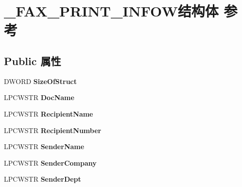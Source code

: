 \hypertarget{struct___f_a_x___p_r_i_n_t___i_n_f_o_w}{}\section{\+\_\+\+F\+A\+X\+\_\+\+P\+R\+I\+N\+T\+\_\+\+I\+N\+F\+O\+W结构体 参考}
\label{struct___f_a_x___p_r_i_n_t___i_n_f_o_w}
\subsection*{Public 属性}
\begin{DoxyCompactItemize}
\item 
\mbox{\label{struct___f_a_x___p_r_i_n_t___i_n_f_o_w_af287ed76892c522230d6124bf4b26918}} 
D\+W\+O\+RD {\bfseries Size\+Of\+Struct}
\item 
\mbox{\label{struct___f_a_x___p_r_i_n_t___i_n_f_o_w_a12504eb10add714cb1990199747f44f7}} 
L\+P\+C\+W\+S\+TR {\bfseries Doc\+Name}
\item 
\mbox{\label{struct___f_a_x___p_r_i_n_t___i_n_f_o_w_aa45891f8dff73d4c3baffee019b2ea4f}} 
L\+P\+C\+W\+S\+TR {\bfseries Recipient\+Name}
\item 
\mbox{\label{struct___f_a_x___p_r_i_n_t___i_n_f_o_w_a299b3e3d73e9dafc66a9988ef177aee9}} 
L\+P\+C\+W\+S\+TR {\bfseries Recipient\+Number}
\item 
\mbox{\label{struct___f_a_x___p_r_i_n_t___i_n_f_o_w_a4c836a004086d94a6f8aae3792309a27}} 
L\+P\+C\+W\+S\+TR {\bfseries Sender\+Name}
\item 
\mbox{\label{struct___f_a_x___p_r_i_n_t___i_n_f_o_w_a46cd31b0503572fd9b468050e4ecb410}} 
L\+P\+C\+W\+S\+TR {\bfseries Sender\+Company}
\item 
\mbox{\label{struct___f_a_x___p_r_i_n_t___i_n_f_o_w_a6b271ddc7d7ad3f13b6b5e87cfbba80f}} 
L\+P\+C\+W\+S\+TR {\bfseries Sender\+Dept}
\item 

\end{DoxyCompactItemize}
